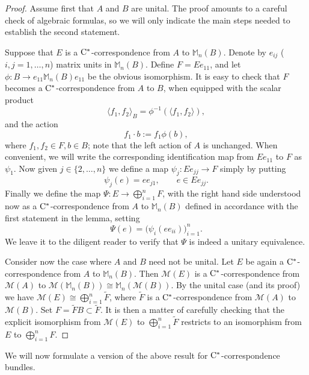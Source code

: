 \documentclass[11 pt, leqno]{amsart}
\numberwithin{equation}{section}
\theoremstyle{plain}
\theoremstyle{definition}
\newcommand{\Mat}{\mathbb M} %
\newcommand{\M}{\mathcal M}
\newcommand{\cst}{\ifmmode\mathrm{C}^*\else{$\mathrm{C}^*$}\fi}
\begin{document}
\begin{proof}
Assume first that $A$ and $B$ are unital.	
The proof amounts to a careful check of algebraic formulas, so we will only indicate the main steps needed to establish the second statement. 
	
Suppose that $E$ is a $\cst$-correspondence from $A$ to $\Mat_n(B)$. 
Denote by $e_{ij}$ ($i,j=1, \ldots, n$) matrix units in $\Mat_n(B)$. 
Define $F = Ee_{11}$, and let $\phi:B \to e_{11}\Mat_n(B) e_{11}$ be the obvious isomorphism. 
It is easy to check that $F$ becomes a $\cst$-correspondence from $A$ to $B$, when equipped with the scalar product 
\[
    \langle f_1, f_2 \rangle_B = \phi^{-1} (\langle f_1, f_2\rangle) ,
\]
and the action
\[
    f_1 \cdot b:= f_1 \phi(b) , 
\] 
where $f_1,f_2 \in F, b \in B$; note that the left action of $A$ is unchanged. 
When convenient, we will write the corresponding identification map from $Ee_{11}$ to $F$ as $\psi_1$.
Now given $j\in \{2, \ldots,n\}$ we define a map $\psi_j:Ee_{jj} \to F$ simply by putting
\[ 
    \psi_j (e) = e e_{j1}, \qquad e \in Ee_{jj} .
\]
Finally we define the map $\Psi : E \to \bigoplus_{i=1}^n F$, with the right hand side understood now as a $\cst$-correspondence from $A$ to $\Mat_n(B)$ defined in accordance with the first statement in the lemma, setting
\[ 
    \Psi(e) = \big( \psi_i (ee_{ii}) \big)_{i=1}^n .
\]
We leave it to the diligent reader to verify that $\Psi$ is indeed a unitary equivalence.	

Consider now the case where $A$ and $B$ need not be unital. 
Let $E$ be again a $\cst$-correspondence from $A$ to $\Mat_n(B)$. 
Then $\M(E)$ is a $\cst$-correspondence from $\M(A)$ to $\M(\Mat_n(B)) \cong \Mat_n(\M(B))$. 
By the unital case (and its proof) we have $\M(E) \cong \bigoplus_{i=1}^n \tilde{F}$, where $\tilde{F}$ is a $\cst$-correspondence from $\M(A)$ to $\M(B)$. 
Set $F = \tilde{F}B \subset \tilde{F}$. 
It is then a matter of carefully checking that the explicit isomorphism from $\M(E)$ to $\bigoplus_{i=1}^n \tilde{F}$ restricts to an isomorphism from $E$ to $\bigoplus_{i=1}^n F$. 
\end{proof}

We will now formulate a version of the above result for $\cst$-correspondence bundles.
\end{document}
